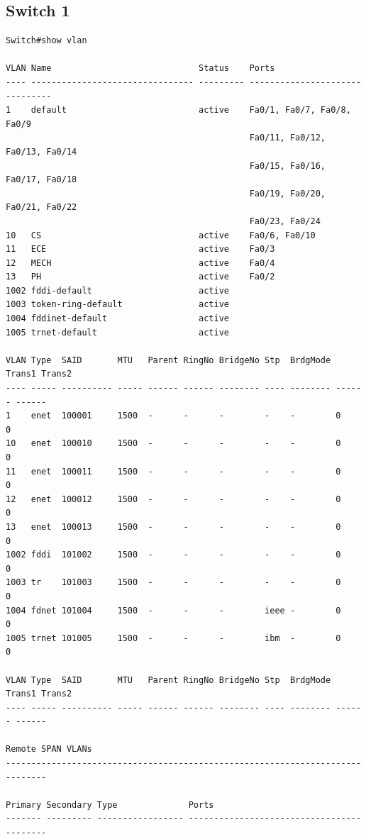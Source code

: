 \documentclass[11pt]{article}
\begin{document}
\subsection{Switch 1}
\begin{lstlisting}
Switch#show vlan

VLAN Name                             Status    Ports
---- -------------------------------- --------- -------------------------------
1    default                          active    Fa0/1, Fa0/7, Fa0/8, Fa0/9
                                                Fa0/11, Fa0/12, Fa0/13, Fa0/14
                                                Fa0/15, Fa0/16, Fa0/17, Fa0/18
                                                Fa0/19, Fa0/20, Fa0/21, Fa0/22
                                                Fa0/23, Fa0/24
10   CS                               active    Fa0/6, Fa0/10
11   ECE                              active    Fa0/3
12   MECH                             active    Fa0/4
13   PH                               active    Fa0/2
1002 fddi-default                     active    
1003 token-ring-default               active    
1004 fddinet-default                  active    
1005 trnet-default                    active    

VLAN Type  SAID       MTU   Parent RingNo BridgeNo Stp  BrdgMode Trans1 Trans2
---- ----- ---------- ----- ------ ------ -------- ---- -------- ------ ------
1    enet  100001     1500  -      -      -        -    -        0      0
10   enet  100010     1500  -      -      -        -    -        0      0
11   enet  100011     1500  -      -      -        -    -        0      0
12   enet  100012     1500  -      -      -        -    -        0      0
13   enet  100013     1500  -      -      -        -    -        0      0
1002 fddi  101002     1500  -      -      -        -    -        0      0   
1003 tr    101003     1500  -      -      -        -    -        0      0   
1004 fdnet 101004     1500  -      -      -        ieee -        0      0   
1005 trnet 101005     1500  -      -      -        ibm  -        0      0   

VLAN Type  SAID       MTU   Parent RingNo BridgeNo Stp  BrdgMode Trans1 Trans2
---- ----- ---------- ----- ------ ------ -------- ---- -------- ------ ------

Remote SPAN VLANs
------------------------------------------------------------------------------

Primary Secondary Type              Ports
------- --------- ----------------- ------------------------------------------
\end{lstlisting}
\end{document}
